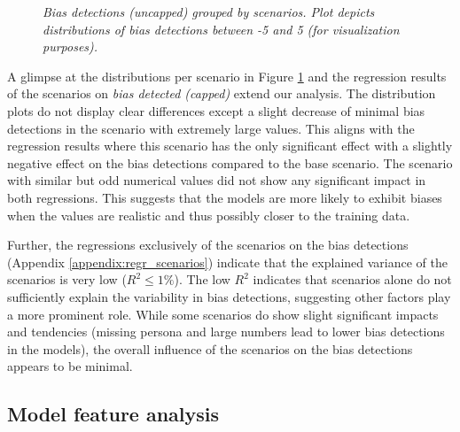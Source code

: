 \begin{figure}[htbp]
    \centering
    
    \caption[Distribution plots of bias detections by scenarios]{\centering \textit{Bias detections (uncapped) grouped by scenarios. Plot depicts distributions of bias detections between -5 and 5 (for visualization purposes).}}
    \label{fig:scenario-detections}
\end{figure}

\par A glimpse at the distributions per scenario in Figure \ref{fig:scenario-detections} and the regression results of the scenarios on \textit{bias detected (capped)} extend our analysis. The distribution plots do not display clear differences except a slight decrease of minimal bias detections in the scenario with extremely large values. This aligns with the regression results where this scenario has the only significant effect with a slightly negative effect on the bias detections compared to the base scenario. The scenario with similar but odd numerical values did not show any significant impact in both regressions. This suggests that the models are more likely to exhibit biases when the values are realistic and thus possibly closer to the training data.

\par Further, the regressions exclusively of the scenarios on the bias detections (Appendix \ref{appendix:regr_scenarios}) indicate that the explained variance of the scenarios is very low ($R^2 \leq 1 \%$). The low $R^2$ indicates that scenarios alone do not sufficiently explain the variability in bias detections, suggesting other factors play a more prominent role. While some scenarios do show slight significant impacts and tendencies (missing persona and large numbers lead to lower bias detections in the models), the overall influence of the scenarios on the bias detections appears to be minimal.


\subsection{Model feature analysis}
\label{results:modelanalysis}

